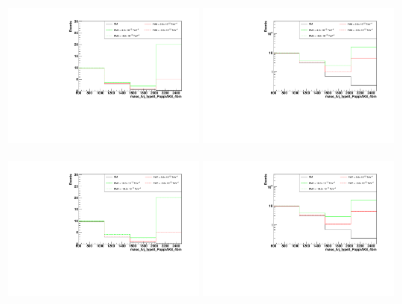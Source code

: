\begin{figure}[h]
  \begin{center}
	\includegraphics[width=0.45\textwidth]{Plots/aQGC_kinematics/mass_lvj_type0_PuppiAK8_4bin_FM6.pdf}%
	\includegraphics[width=0.45\textwidth]{Plots/aQGC_kinematics/mass_lvj_type0_PuppiAK8_4bin_FM6_log.pdf}\\	
    \caption{}
  \end{center}
\end{figure}
\begin{figure}[h]
  \begin{center}
	\includegraphics[width=0.45\textwidth]{Plots/aQGC_kinematics/mass_lvj_type0_PuppiAK8_4bin_FM7.pdf}%
	\includegraphics[width=0.45\textwidth]{Plots/aQGC_kinematics/mass_lvj_type0_PuppiAK8_4bin_FM7_log.pdf}\\	
    \caption{}
  \end{center}
\end{figure}
